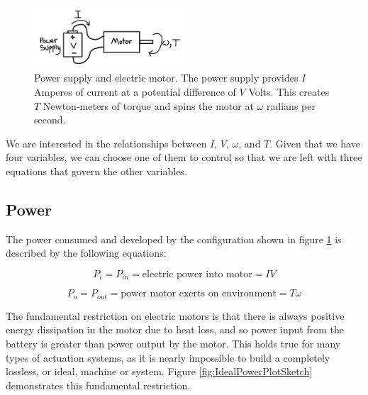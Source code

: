 \begin{figure}[h]		%
\begin{centering}
\includegraphics[width=0.5\textwidth]{Figures/PowerSupplyAndMotor}\par
\end{centering}
\caption[Diagram: Power Supply and Electric Motor]{Power supply and electric motor. The power supply provides $I$ Amperes of current at a potential difference of $V$ Volts. This creates $T$ Newton-meters of torque and spins the motor at $\omega$ radians per second.}
\label{fig:PowerSupplyAndMotor}
\end{figure}
%

We are interested in the relationships between $I$, $V$, $\omega$, and $T$. Given that we have four variables, we can choose one of them to control so that we are left with three equations that govern the other variables.

\subsection*{Power}
\label{sec:Power}

The power consumed and developed by the configuration shown in figure \ref{fig:PowerSupplyAndMotor} is described by the following equations:

\begin{equation}
P_{i}=P_{in} = \mbox{electric power into motor}= IV
\label{eq:PowerIn}
\end{equation}

\begin{equation}
P_{o}=P_{out} = \mbox{power motor exerts on environment} = T\omega
\label{eq:PowerOut}
\end{equation}

The fundamental restriction on electric motors is that there is always positive energy dissipation in the motor due to heat loss, and so power input from the battery is greater than power output by the motor. This holds true for many types of actuation systems, as it is nearly impossible to build a completely lossless, or ideal, machine or system. Figure \ref{fig:IdealPowerPlotSketch} demonstrates this fundamental restriction.

